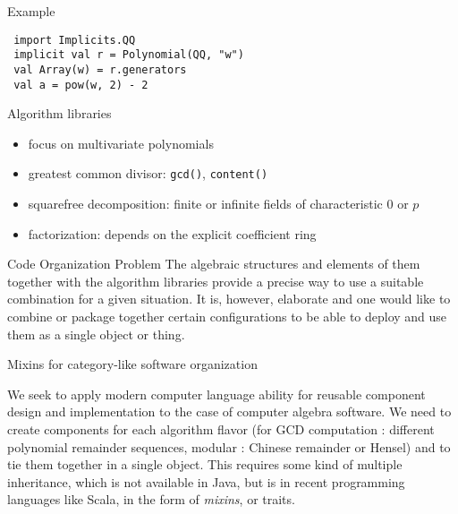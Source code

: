 \documentclass[final]{beamer}
\newcommand{\code}[1]{\texttt{#1}}
\begin{document}
\begin{frame}[fragile]
\begin{columns}[t]
\begin{column}{.3\linewidth}
  \begin{block}{\large Example}
\tiny 
\begin{lstlisting} 
 import Implicits.QQ
 implicit val r = Polynomial(QQ, "w")
 val Array(w) = r.generators
 val a = pow(w, 2) - 2 
\end{lstlisting} 
  \end{block}
  \hfill
  \begin{block}{\large Algorithm libraries}
  \scriptsize 
  \begin{itemize}
  \item focus on multivariate polynomials
  \item greatest common divisor: \code{gcd()}, \code{content()}
  \item squarefree decomposition: finite or infinite fields of characteristic 0 or $p$
  \item factorization: depends on the explicit coefficient ring
  \end{itemize}
  \end{block}
  \hfill
  \begin{block}{\large Code Organization Problem}
  \scriptsize 
The algebraic structures and elements of them together
with the algorithm libraries provide a precise way to use a suitable
combination for a given situation. It is, however, elaborate and one
would like to combine or package together certain configurations to be
able to deploy and use them as a single object or thing. 
  \end{block}
  \hfill
  \begin{block}{\large Mixins for category-like software organization}
{\scriptsize %
We seek to apply modern computer language ability for reusable
component design and implementation to the case of computer algebra
software. We need to create components for each algorithm flavor
(for GCD computation : different polynomial remainder sequences,
modular : Chinese remainder or Hensel) and to tie them together
in a single object. This requires some kind of multiple inheritance,
which is not available in Java, but is in recent programming
languages like Scala, in the form of {\em mixins}, or traits.
\par}\par
  \end{block}
\hfill
\end{column}



\end{columns}
\end{frame}
\end{document}
